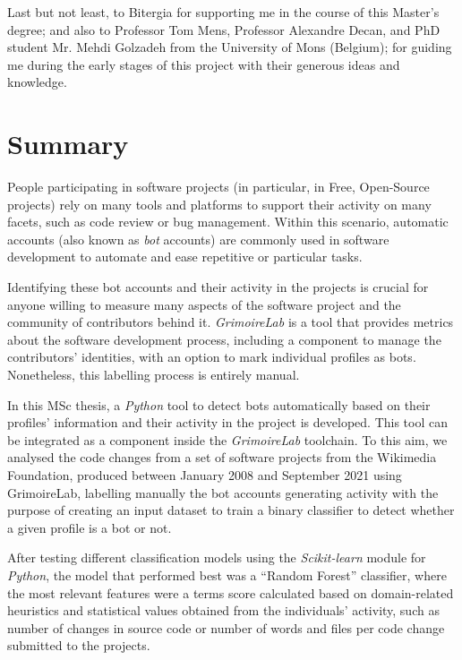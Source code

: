 \documentclass[a4paper, 12pt]{book}
\begin{document}
Last but not least, to Bitergia for supporting me in the course of this Master's degree; and also to Professor Tom Mens, Professor Alexandre Decan, and PhD student Mr. Mehdi Golzadeh from the University of Mons (Belgium); for guiding me during the early stages of this project with their generous ideas and knowledge.




\chapter*{Summary}

People participating in software projects (in particular, in Free, Open-Source projects) rely on many tools and platforms to support their activity on many facets, such as code review or bug management. Within this scenario, automatic accounts (also known as \emph{bot} accounts) are commonly used in software development to automate and ease repetitive or particular tasks.

Identifying these bot accounts and their activity in the projects is crucial for anyone willing to measure many aspects of the software project and the community of contributors behind it. \emph{GrimoireLab} is a tool that provides metrics about the software development process, including a component to manage the contributors' identities, with an option to mark individual profiles as bots. Nonetheless, this labelling process is entirely manual.

In this MSc thesis, a \emph{Python} tool to detect bots automatically based on their profiles' information and their activity in the project is developed. This tool can be integrated as a component inside the \emph{GrimoireLab} toolchain. To this aim, we analysed the code changes from a set of software projects from the Wikimedia Foundation, produced between January 2008 and September 2021 using GrimoireLab, labelling manually the bot accounts generating activity with the purpose of creating an input dataset to train a binary classifier to detect whether a given profile is a bot or not.

After testing different classification models using the \emph{Scikit-learn} module for \emph{Python}, the model that performed best was a ``Random Forest'' classifier, where the most relevant features were a terms score calculated based on domain-related heuristics and statistical values obtained from the individuals' activity, such as number of changes in source code or number of words and files per code change submitted to the projects.
\end{document}

